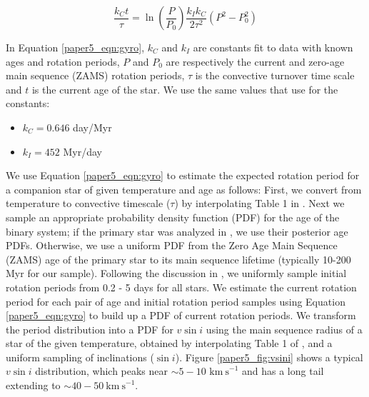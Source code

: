 \begin{equation}
\frac{k_Ct}{\tau} = \ln\left ( \frac{P}{P_0} \right ) \frac{k_Ik_C}{2\tau^2} (P^2 - P_0^2)
\label{paper5_eqn:gyro}
\end{equation}

In Equation \ref{paper5_eqn:gyro}, $k_C$ and $k_I$ are constants fit to data with known ages and rotation periods, $P$ and $P_0$ are respectively the current and zero-age main sequence (ZAMS) rotation periods, $\tau$ is the convective turnover time scale and $t$ is the current age of the star. We use the same values that \cite{Barnes2010b} use for the constants:

\begin{itemize}
\item $k_C = 0.646$ day/Myr
\item $k_I = 452$ Myr/day
\end{itemize}

We use Equation \ref{paper5_eqn:gyro} to estimate the expected rotation period for a companion star of given temperature and age as follows: First, we convert from temperature to convective timescale ($\tau$) by interpolating Table 1 in \citet{Barnes2010a}. Next we sample an appropriate probability density function (PDF) for the age of the binary system; if the primary star was analyzed in \citet{David2015}, we use their posterior age PDFs. Otherwise, we use a uniform PDF from the Zero Age Main Sequence (ZAMS) age of the primary star to its main sequence lifetime (typically 10-200 Myr for our sample). Following the discussion in \cite{Barnes2010b}, we uniformly sample initial rotation periods from 0.2 - 5 days for all stars. We estimate the current rotation period for each pair of age and initial rotation period samples using Equation \ref{paper5_eqn:gyro} to build up a PDF of current rotation periods. We transform the period distribution into a PDF for $v\sin{i}$ using the main sequence radius of a star of the given temperature, obtained by interpolating Table 1 of \cite{Barnes2010a}, and a uniform sampling of inclinations ($\sin{i}$). Figure \ref{paper5_fig:vsini} shows a typical $v\sin{i}$ distribution, which peaks near $\sim 5-10$ $\mathrm{km\ s}^{-1}$ and has a long tail extending to $\sim 40-50 \ \mathrm{km\ s}^{-1}$.


